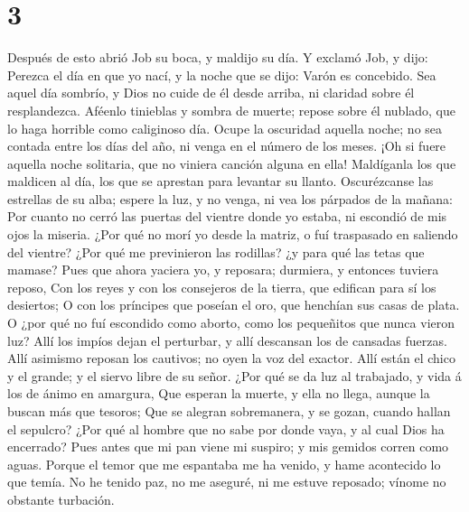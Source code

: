 \hypertarget{section-2}{%
\section{3}\label{section-2}}

 Después de esto abrió Job su boca, y maldijo su día.
 Y exclamó Job, y dijo:  Perezca el día en
que yo nací, y la noche que se dijo: Varón es concebido. 
Sea aquel día sombrío, y Dios no cuide de él desde arriba, ni claridad
sobre él resplandezca.  Aféenlo tinieblas y sombra de
muerte; repose sobre él nublado, que lo haga horrible como caliginoso
día.  Ocupe la oscuridad aquella noche; no sea contada
entre los días del año, ni venga en el número de los meses.
 ¡Oh si fuere aquella noche solitaria, que no viniera
canción alguna en ella!  Maldíganla los que maldicen al
día, los que se aprestan para levantar su llanto. 
Oscurézcanse las estrellas de su alba; espere la luz, y no venga, ni vea
los párpados de la mañana:  Por cuanto no cerró las
puertas del vientre donde yo estaba, ni escondió de mis ojos la miseria.
 ¿Por qué no morí yo desde la matriz, o fuí traspasado en
saliendo del vientre?  ¿Por qué me previnieron las
rodillas? ¿y para qué las tetas que mamase?  Pues que
ahora yaciera yo, y reposara; durmiera, y entonces tuviera reposo,
 Con los reyes y con los consejeros de la tierra, que
edifican para sí los desiertos;  O con los príncipes que
poseían el oro, que henchían sus casas de plata.  O ¿por
qué no fuí escondido como aborto, como los pequeñitos que nunca vieron
luz?  Allí los impíos dejan el perturbar, y allí
descansan los de cansadas fuerzas.  Allí asimismo reposan
los cautivos; no oyen la voz del exactor.  Allí están el
chico y el grande; y el siervo libre de su señor.  ¿Por
qué se da luz al trabajado, y vida á los de ánimo en amargura,
 Que esperan la muerte, y ella no llega, aunque la buscan
más que tesoros;  Que se alegran sobremanera, y se gozan,
cuando hallan el sepulcro?  ¿Por qué al hombre que no
sabe por donde vaya, y al cual Dios ha encerrado?  Pues
antes que mi pan viene mi suspiro; y mis gemidos corren como aguas.
 Porque el temor que me espantaba me ha venido, y hame
acontecido lo que temía.  No he tenido paz, no me
aseguré, ni me estuve reposado; vínome no obstante turbación.

